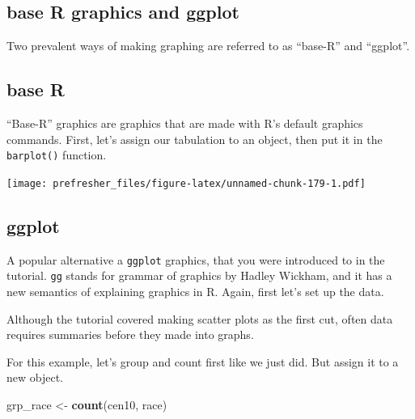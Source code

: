 \documentclass[]{book}
\newenvironment{Shaded}{\begin{snugshade}}{\end{snugshade}}
\newcommand{\KeywordTok}[1]{\textcolor[rgb]{0.13,0.29,0.53}{\textbf{#1}}}
\newcommand{\NormalTok}[1]{#1}
\newcommand{\OperatorTok}[1]{\textcolor[rgb]{0.81,0.36,0.00}{\textbf{#1}}}
\newcommand{\StringTok}[1]{\textcolor[rgb]{0.31,0.60,0.02}{#1}}
\theoremstyle{definition}
\theoremstyle{definition}
\theoremstyle{definition}
\theoremstyle{remark}
\begin{document}
\begin{Shaded}
\begin{Highlighting}[]
\begin{Shaded}
\begin{Highlighting}[]
\hypertarget{base-r-graphics-and-ggplot}{%
\section{base R graphics and ggplot}\label{base-r-graphics-and-ggplot}}

Two prevalent ways of making graphing are referred to as ``base-R'' and ``ggplot''.

\hypertarget{base-r}{%
\subsection{base R}\label{base-r}}

``Base-R'' graphics are graphics that are made with R's default graphics commands. First, let's assign our tabulation to an object,
then put it in the \texttt{barplot()} function.

\begin{Shaded}
\end{Shaded}

\texttt{[image: prefresher\_files/figure-latex/unnamed-chunk-179-1.pdf]}

\hypertarget{ggplot}{%
\subsection{ggplot}\label{ggplot}}

A popular alternative a \texttt{ggplot} graphics, that you were introduced to in the tutorial. \texttt{gg} stands for grammar of graphics by Hadley Wickham, and it has a new semantics of explaining graphics in R. Again, first let's set up the data.

Although the tutorial covered making scatter plots as the first cut, often data requires summaries before they made into graphs.

For this example, let's group and count first like we just did. But assign it to a new object.

\begin{Shaded}
\begin{Highlighting}[]
\NormalTok{grp_race <-}\StringTok{ }\KeywordTok{count}\NormalTok{(cen10, race)}
\end{Highlighting}
\end{Shaded}


\end{Highlighting}
\end{Shaded}
\end{Highlighting}
\end{Shaded}
\end{document}
